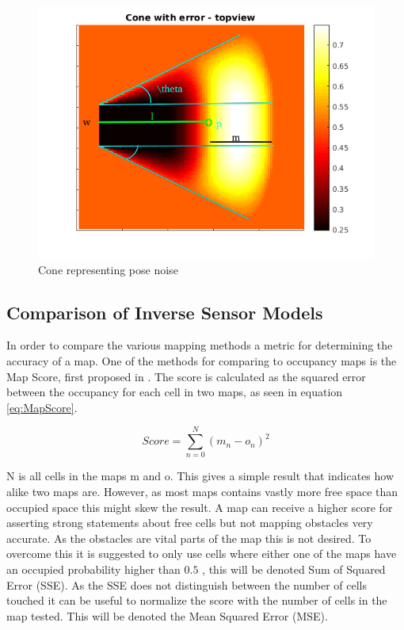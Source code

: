 \begin{figure}[htbp]
	\centering
	\includegraphics[width=\textwidth]{figures/static_mapping/cone_noise_top}
	\caption{Cone representing pose noise}
	\label{fig:cone_with_noise_top}
\end{figure}

\subsection{Comparison of Inverse Sensor Models}
In order to compare the various mapping methods a metric for determining the accuracy of a map. One of the methods for comparing to occupancy maps is the Map Score, first proposed in \cite{MoravecMartin}. The score is calculated as the squared error between the occupancy for each cell in two maps, as seen in equation \vref{eq:MapScore}.

\begin{equation}
\label{eq:MapScore}
Score = \sum_{n=0}^{N} (m_{n} - o_{n})^2
\end{equation}

N is all cells in the maps m and o. 
This gives a simple result that indicates how alike two maps are. 
However, as most maps contains vastly more free space than occupied space this might skew the result. 
A map can receive a higher score for asserting strong statements about free cells but not mapping obstacles very accurate. 
As the obstacles are vital parts of the map this is not desired. 
To overcome this it is suggested to only use cells where either one of the maps have an occupied probability higher than \(0.5\) \cite{Sullivan2003}, this will be denoted Sum of Squared Error (SSE).
As the SSE does not distinguish between the number of cells touched it can be useful to normalize the score with the number of cells in the map tested. This will be denoted the Mean Squared Error (MSE).  

